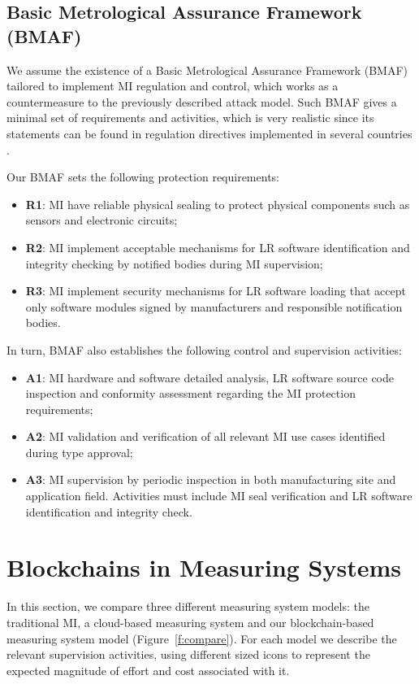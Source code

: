\documentclass[journal]{IEEEtran}
\begin{document}
\subsection{Basic Metrological Assurance Framework (BMAF)}
We assume the existence of a Basic Metrological Assurance Framework (BMAF) tailored to implement MI regulation and control, which works as a countermeasure to the previously described attack model. Such BMAF gives a minimal set of requirements and activities, which is very realistic since its statements can be found in regulation directives implemented in several countries \cite{Esche2015,Camara2012,Boccardo2014,Luchsinger2008}.

Our BMAF sets the following protection requirements:
\begin{itemize}
 \item \textbf{R1}: MI have reliable physical sealing to protect physical components such as sensors and electronic circuits;
 \item \textbf{R2}: MI implement acceptable mechanisms for LR software identification and integrity checking by notified bodies during MI supervision;
 \item \textbf{R3}: MI implement security mechanisms for LR software loading that accept only software modules signed by manufacturers and responsible notification bodies.
\end{itemize}

In turn, BMAF also establishes the following control and supervision activities:
\begin{itemize}
 \item \textbf{A1}: MI hardware and software detailed analysis, LR software source code inspection and conformity assessment regarding the MI protection requirements;
 \item \textbf{A2}: MI validation and verification of all relevant MI use cases identified during type approval;
 \item \textbf{A3}: MI supervision by periodic inspection in both manufacturing site and application field. Activities must include MI seal verification and LR software identification and integrity check.
\end{itemize}

\section{Blockchains in Measuring Systems}
In this section, we compare three different measuring system models: the traditional MI, a cloud-based measuring system and our blockchain-based measuring system model (Figure~\ref{f:compare}). For each model we describe the relevant supervision activities, using different sized icons to represent the expected magnitude of effort and cost associated with it.
\end{document}
